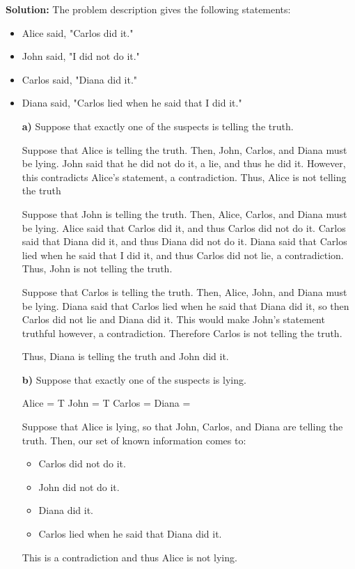 \documentclass{Axon}
\begin{document}
\noindent
\textbf{Solution:}
The problem description gives the following statements:
\begin{itemize}
    \item Alice said, "Carlos did it."
    \item John said, "I did not do it."
    \item Carlos said, "Diana did it."
    \item Diana said, "Carlos lied when he said that I did it."
\end{itemize}

\begin{enumerate}
    \item[\textbf{a)}] Suppose that exactly one of the suspects is telling the truth.
    
    Suppose that Alice is telling the truth. Then, John, Carlos, and Diana must be lying. John said that he did not do it, a lie, and thus he did it. However, this contradicts Alice's statement, a contradiction. Thus, Alice is not telling the truth
    
    Suppose that John is telling the truth. Then, Alice, Carlos, and Diana must be lying. Alice said that Carlos did it, and thus Carlos did not do it. Carlos said that Diana did it, and thus Diana did not do it. Diana said that Carlos lied when he said that I did it, and thus Carlos did not lie, a contradiction. Thus, John is not telling the truth.

    Suppose that Carlos is telling the truth. Then, Alice, John, and Diana must be lying. Diana said that Carlos lied when he said that Diana did it, so then Carlos did not lie and Diana did it. This would make John's statement truthful however, a contradiction. Therefore Carlos is not telling the truth.

    Thus, Diana is telling the truth and John did it.
    
    \item[\textbf{b)}] Suppose that exactly one of the suspects is lying.

    Alice = T
    John = T
    Carlos =
    Diana =

    Suppose that Alice is lying, so that John, Carlos, and Diana are telling the truth. Then, our set of known information comes to:
    \begin{itemize}
        \item Carlos did not do it.
        \item John did not do it.
        \item Diana did it.
        \item Carlos lied when he said that Diana did it.
    \end{itemize}
    This is a contradiction and thus Alice is not lying.


\end{enumerate}
\end{document}
